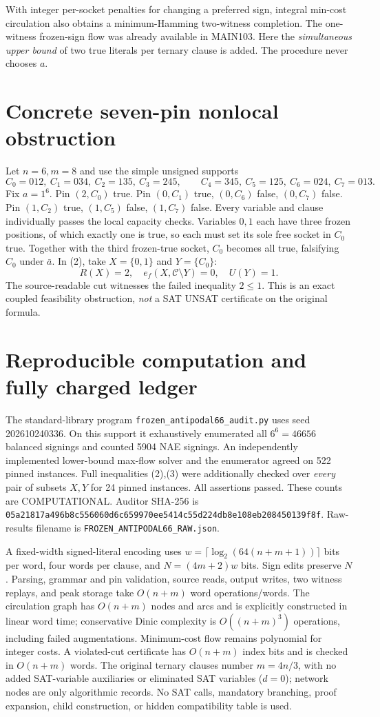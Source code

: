 \documentclass[11pt]{article}
\begin{document}
With integer per-socket penalties for changing a preferred sign, integral min-cost circulation also obtains a minimum-Hamming two-witness completion. The one-witness frozen-sign flow was already available in MAIN103. Here the \emph{simultaneous upper bound} of two true literals per ternary clause is added. The procedure never chooses $a$.
\section{Concrete seven-pin nonlocal obstruction}
Let $n=6,m=8$ and use the simple unsigned supports
\[
C_0=012,\ C_1=034,\ C_2=135,\ C_3=245,\qquad
C_4=345,\ C_5=125,\ C_6=024,\ C_7=013.
\]
Fix $a=1^6$. Pin $(2,C_0)$ true. Pin $(0,C_1)$ true, $(0,C_6)$ false, $(0,C_7)$ false. Pin $(1,C_2)$ true, $(1,C_5)$ false, $(1,C_7)$ false. Every variable and clause individually passes the local capacity checks. Variables $0,1$ each have three frozen positions, of which exactly one is true, so each must set its sole free socket in $C_0$ true. Together with the third frozen-true socket, $C_0$ becomes all true, falsifying $C_0$ under $\bar a$. In (2), take $X=\{0,1\}$ and $Y=\{C_0\}$:
\[
R(X)=2,\quad e_f(X,\mathcal C\setminus Y)=0,\quad U(Y)=1.
\]
The source-readable cut witnesses the failed inequality $2\le1$. This is an exact coupled feasibility obstruction, \emph{not} a SAT UNSAT certificate on the original formula.
\section{Reproducible computation and fully charged ledger}
The standard-library program \texttt{frozen\_antipodal66\_audit.py} uses seed 202610240336. On this support it exhaustively enumerated all $6^6=46656$ balanced signings and counted 5904 NAE signings. An independently implemented lower-bound max-flow solver and the enumerator agreed on 522 pinned instances. Full inequalities (2),(3) were additionally checked over \emph{every} pair of subsets $X,Y$ for 24 pinned instances. All assertions passed. These counts are COMPUTATIONAL. Auditor SHA-256 is \texttt{05a21817a496b8c556060d6c659970ee5414c55d224db8e108eb208450139f8f}. Raw-results filename is \texttt{FROZEN\_ANTIPODAL66\_RAW.json}.

A fixed-width signed-literal encoding uses $w=\lceil\log_2(64(n+m+1))\rceil$ bits per word, four words per clause, and $N=(4m+2)w$ bits. Sign edits preserve $N$. Parsing, grammar and pin validation, source reads, output writes, two witness replays, and peak storage take $O(n+m)$ word operations/words. The circulation graph has $O(n+m)$ nodes and arcs and is explicitly constructed in linear word time; conservative Dinic complexity is $O((n+m)^3)$ operations, including failed augmentations. Minimum-cost flow remains polynomial for integer costs. A violated-cut certificate has $O(n+m)$ index bits and is checked in $O(n+m)$ words. The original ternary clauses number $m=4n/3$, with no added SAT-variable auxiliaries or eliminated SAT variables ($d=0$); network nodes are only algorithmic records. No SAT calls, mandatory branching, proof expansion, child construction, or hidden compatibility table is used.
\end{document}

